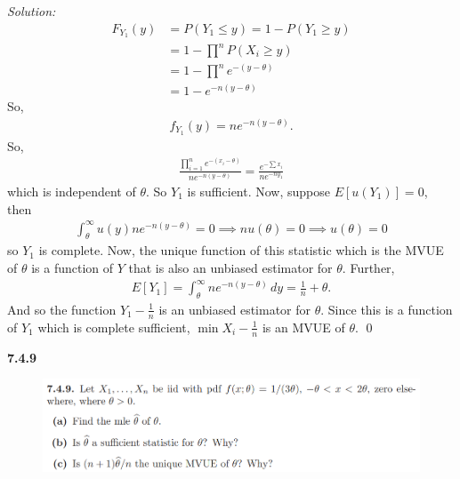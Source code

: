 \documentclass{book}
\theoremstyle{definition}
\newcommand{\nn}{\nonumber}
\newcommand{\f}[2]{\frac{#1}{#2}}
\begin{document}
\noindent \textit{Solution:} 
\begin{align}
F_{Y_1}(y) &= P(Y_1 \leq y) = 1 - P(Y_1 \geq y)\nn\\
&= 1 - \prod^n P(X_i \geq y) \nn\\
&= 1- \prod^n e^{-(y - \theta)}\nn\\
&= 1 - e^{-n(y-\theta)}
\end{align}
So, 
\begin{align}
f_{Y_1}(y) = ne^{-n(y-\theta)}.
\end{align}
So,
\begin{align}
\f{\prod^n_{i=1}e^{-(x_i-\theta)}}{ne^{-n(y-\theta)}} = \f{e^{-\sum x_i}}{ne^{-ny_1}} 
\end{align}
which is independent of $\theta$. So $Y_1$ is sufficient. Now, suppose $E[u(Y_1)] = 0$, then 
\begin{align}
\int^\infty_\theta u(y)ne^{-n(y-\theta)} = 0 \implies nu(\theta) = 0\implies u(\theta) = 0
\end{align}
so $Y_1$ is complete. Now, the unique function of this statistic which is the MVUE of $\theta$ is a function of $Y$ that is also an unbiased estimator for $\theta$. Further,
\begin{align*}
E[Y_1] = \int^\infty_\theta ne^{-n(y-\theta)}\,dy = \f{1}{n} + \theta. 
\end{align*}
And so the function $Y_1 - \f{1}{n}$ is an unbiased estimator for $\theta$. Since this is a function of $Y_1$ which is complete sufficient, $\min X_i - \f{1}{n}$ is an MVUE of $\theta$.  \qed








\newpage





\noindent\textbf{7.4.9}
\begin{figure}[!htb]
	\centering
	\includegraphics[scale=1]{749}
\end{figure}
\end{document}
